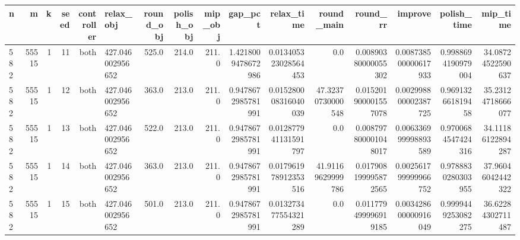 \begin{tabular}{lrrrrlrrrrrrrrrr}
\hline
n & m & k & seed & controller & relax_obj & round_obj & polish_obj & mip_obj & gap_pct & relax_time & round_main & round_rr & improve & polish_time & mip_time \\ \hline
582 & 55515 & 1 & 11 & both & 427.046002956652 & 525.0 & 214.0 & 211.0 & 1.4218009478672986 & 0.013405323028564453 & 0.0 & 0.00890380000055302 & 0.008738500000617933 & 0.9988694190979004 & 34.08724522590637 \\
582 & 55515 & 1 & 12 & both & 427.046002956652 & 363.0 & 213.0 & 211.0 & 0.9478672985781991 & 0.015280008316040039 & 47.32370730000548 & 0.015201900001557078 & 0.002998800002387725 & 0.969132661819458 & 35.23124718666077 \\
582 & 55515 & 1 & 13 & both & 427.046002956652 & 522.0 & 213.0 & 211.0 & 0.9478672985781991 & 0.012877941131591797 & 0.0 & 0.008797800001048017 & 0.006336999998893589 & 0.9700684547424316 & 34.11186122894287 \\
582 & 55515 & 1 & 14 & both & 427.046002956652 & 363.0 & 213.0 & 211.0 & 0.9478672985781991 & 0.017961978912353516 & 41.91169629999786 & 0.017908199995872565 & 0.002561799999966752 & 0.9788830280303955 & 37.96046042442322 \\
582 & 55515 & 1 & 15 & both & 427.046002956652 & 501.0 & 213.0 & 211.0 & 0.9478672985781991 & 0.013273477554321289 & 0.0 & 0.011779499996919185 & 0.003428600000916049 & 0.9999449253082275 & 36.62284302711487 \\
\hline
\end{tabular}
